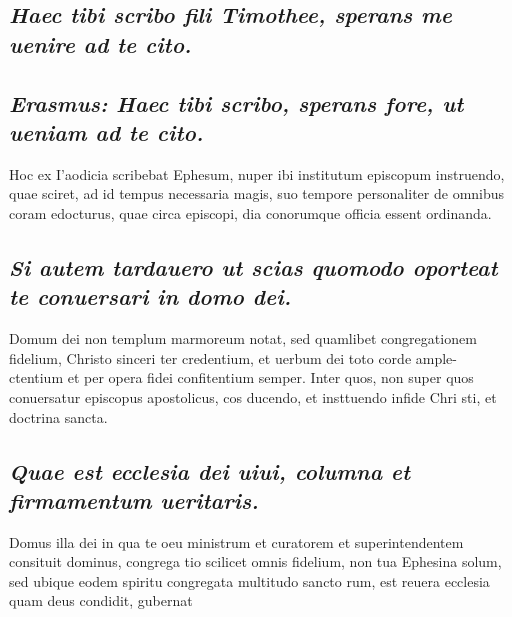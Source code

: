 \documentclass{article}
\begin{document}
\begin{pages}
\subsection*{\textit{Haec tibi scribo fili Timothee, sperans me uenire ad te cito. }}
{}
\subsection*{\textit{Erasmus: Haec tibi scribo, sperans fore, ut ueniam ad te cito. }}\pstart Hoc ex I'aodicia scribebat Ephesum, nuper ibi institutum episcopum instruendo, quae sciret, ad id tempus necessaria magis, suo tempore personaliter de omnibus coram edocturus, quae circa episcopi, dia conorumque officia essent ordinanda.  \pend
{}
{}
\subsection*{\textit{Si autem tardauero ut scias quomodo oporteat te conuersari in domo dei. }}\pstart Domum dei non templum marmoreum notat, sed quamlibet congregationem fidelium, Christo sinceri ter credentium, et uerbum dei toto corde ample- ctentium et per opera fidei confitentium semper. Inter quos, non super quos conuersatur episcopus apostolicus, cos ducendo, et insttuendo infide Chri sti, et doctrina sancta.  \pend
{}
{}
\subsection*{\textit{Quae est ecclesia dei uiui, columna et firmamentum ueritaris. }}\pstart Domus illa dei in qua te oeu ministrum et curatorem et superintendentem consituit dominus, congrega tio scilicet omnis fidelium, non tua Ephesina solum, sed ubique eodem spiritu congregata multitudo sancto rum, est reuera ecclesia quam deus condidit, gubernat  \pend

\end{pages}
\end{document}
